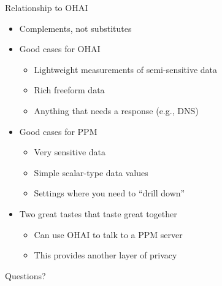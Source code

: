 \documentclass[helvetica]{beamer}
\begin{document}
\begin{frame}{Relationship to OHAI}

  \begin{itemize}
  \item Complements, not substitutes
  \item Good cases for OHAI    
    \begin{itemize}
    \item Lightweight measurements of semi-sensitive data
    \item Rich freeform data
    \item Anything that needs a response (e.g., DNS)
    \end{itemize}

  \item Good cases for PPM
    \begin{itemize}
    \item Very sensitive data
    \item Simple scalar-type data values
    \item Settings where you need to ``drill down''
    \end{itemize}

  \item Two great tastes that taste great together
    \begin{itemize}
    \item Can use OHAI to talk to a PPM server
    \item This provides another layer of privacy
    \end{itemize}
  \end{itemize}
\end{frame}

\begin{frame}{Questions?}

\end{frame}



\end{document}
